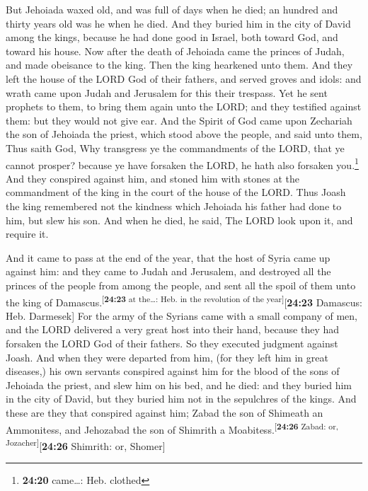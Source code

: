 But Jehoiada waxed old, and was full of days when he
died; an hundred and thirty years old was he when he died.
 And they buried him in the city of David among the
kings, because he had done good in Israel, both toward God, and toward
his house.  Now after the death of Jehoiada came the
princes of Judah, and made obeisance to the king. Then the king
hearkened unto them.  And they left the house of the LORD
God of their fathers, and served groves and idols: and wrath came upon
Judah and Jerusalem for this their trespass.  Yet he sent
prophets to them, to bring them again unto the LORD; and they testified
against them: but they would not give ear.  And the
Spirit of God came upon Zechariah the son of Jehoiada the priest, which
stood above the people, and said unto them, Thus saith God, Why
transgress ye the commandments of the LORD, that ye cannot prosper?
because ye have forsaken the LORD, he hath also forsaken you.\footnote{\textbf{24:20}
  came\ldots: Heb. clothed}  And they conspired against
him, and stoned him with stones at the commandment of the king in the
court of the house of the LORD.  Thus Joash the king
remembered not the kindness which Jehoiada his father had done to him,
but slew his son. And when he died, he said, The LORD look upon it, and
require it.

 And it came to pass at the end of the year, that the
host of Syria came up against him: and they came to Judah and Jerusalem,
and destroyed all the princes of the people from among the people, and
sent all the spoil of them unto the king of
Damascus.\textsuperscript{{[}\textbf{24:23} at the\ldots: Heb. in the
revolution of the year{]}}{[}\textbf{24:23} Damascus: Heb. Darmesek{]}
 For the army of the Syrians came with a small company of
men, and the LORD delivered a very great host into their hand, because
they had forsaken the LORD God of their fathers. So they executed
judgment against Joash.  And when they were departed from
him, (for they left him in great diseases,) his own servants conspired
against him for the blood of the sons of Jehoiada the priest, and slew
him on his bed, and he died: and they buried him in the city of David,
but they buried him not in the sepulchres of the kings. 
And these are they that conspired against him; Zabad the son of Shimeath
an Ammonitess, and Jehozabad the son of Shimrith a
Moabitess.\textsuperscript{{[}\textbf{24:26} Zabad: or,
Jozacher{]}}{[}\textbf{24:26} Shimrith: or, Shomer{]}

